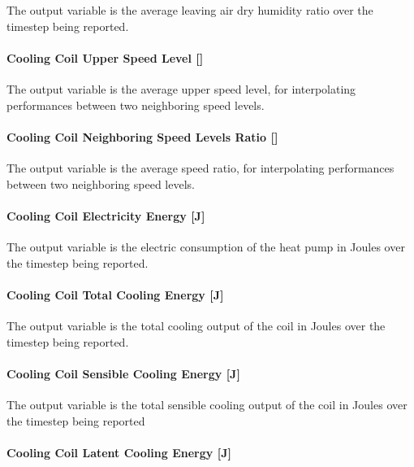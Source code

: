 The output variable is the average leaving air dry humidity ratio over the timestep being reported.

\paragraph{Cooling Coil Upper Speed Level {[]}}\label{cooling-coil-upper-speed-level}

The output variable is the average upper speed level, for interpolating performances between two neighboring speed levels.

\paragraph{Cooling Coil Neighboring Speed Levels Ratio {[]}}\label{cooling-coil-neighboring-speed-levels-ratio}

The output variable is the average speed ratio, for interpolating performances between two neighboring speed levels.

\paragraph{Cooling Coil Electricity Energy {[}J{]}}\label{cooling-coil-electric-energy-j-1}

The output variable is the electric consumption of the heat pump in Joules over the timestep being reported.

\paragraph{Cooling Coil Total Cooling Energy {[}J{]}}\label{cooling-coil-total-cooling-energy-j-5}

The output variable is the total cooling output of the coil in Joules over the timestep being reported.

\paragraph{Cooling Coil Sensible Cooling Energy {[}J{]}}\label{cooling-coil-sensible-cooling-energy-j-5}

The output variable is the total sensible cooling output of the coil in Joules over the timestep being reported

\paragraph{Cooling Coil Latent Cooling Energy {[}J{]}}\label{cooling-coil-latent-cooling-energy-j-3}

